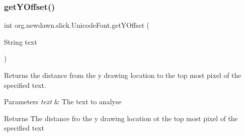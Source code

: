 \subsubsection{\texorpdfstring{get\+Y\+Offset()}{getYOffset()}}
{\footnotesize\ttfamily int org.\+newdawn.\+slick.\+Unicode\+Font.\+get\+Y\+Offset (\begin{DoxyParamCaption}\item[{String}]{text }\end{DoxyParamCaption})\hspace{0.3cm}{\ttfamily [inline]}}

Returns the distance from the y drawing location to the top most pixel of the specified text.


\begin{DoxyParams}{Parameters}
{\em text} & The text to analyse \\
\hline
\end{DoxyParams}
\begin{DoxyReturn}{Returns}
The distance fro the y drawing location ot the top most pixel of the specified text 
\end{DoxyReturn}

